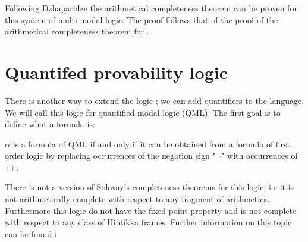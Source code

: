 \documentclass[../main.tex]{subfiles}
\begin{document}
Following Dzhaparidze the arithmetical completeness theorem can be proven for
this system of multi modal logic. The proof follows that of the proof of the
arithmetical completeness theorem for \GLB.

\section{Quantifed provability logic}
There is another way to extend the logic \GL; we can add quantifiers to the
language. We will call this logic for quantified modal logic (QML). The first
goal is to define what a formula is:
\begin{defi}
	$\alpha$ is a formula of QML if and only if it can be obtained from a
	formula of first order logic by
	replacing occurrences of the negation sign "$\neg$" with occurrences of
	$\Box$. 
\end{defi}

	There is not a version of Solovay's completeness theorems for this
	logic; i.e it is not arithmetically complete with respect to any
	fragment of arithmetics. Furthermore this logic  do not have the fixed point property and
	is not complete with respect to any class of Hintikka frames. Further information on this topic can be found i \cite{Boolos1993}
\end{document}
